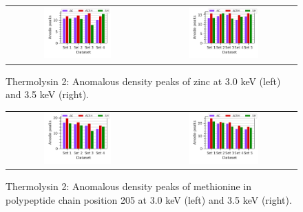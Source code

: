\begin{figure}
    \centering
    \begin{tabular}{cc}
        \includegraphics[width = 0.5\textwidth]{plots/exp1/tlys_2_P6122/peaks/3p0_zinc.pdf} & \includegraphics[width = 0.5\textwidth]{plots/exp1/tlys_2_P6122/peaks/3p5_zinc.pdf}
    \end{tabular}
    \caption{Thermolysin 2: Anomalous density peaks of zinc at 3.0 \unit{keV} (left) and 3.5 \unit{keV} (right).}
    \label{fig:tlys2_zn_peaks}
\end{figure}

\begin{figure}
    \centering
    \begin{tabular}{cc}
        \includegraphics[width = 0.5\textwidth]{plots/exp1/tlys_2_P6122/peaks/3p0_met250.pdf} & \includegraphics[width = 0.5\textwidth]{plots/exp1/tlys_2_P6122/peaks/3p5_met250.pdf}
    \end{tabular}
    \caption{Thermolysin 2: Anomalous density peaks of methionine in polypeptide chain position 205 at 3.0 \unit{keV} (left) and 3.5 \unit{keV} (right).}
    \label{fig:tlys2_met_205_peaks}
\end{figure}

